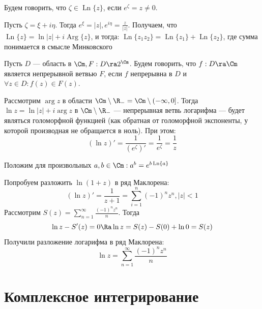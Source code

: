 \begin{note}

\end{note}

\begin{definition}
    Будем говорить, что \(\zeta \in \operatorname{Ln}\{z\}\), если \(e^\zeta = z \ne 0\).
\end{definition}
\begin{note}
    Пусть \(\zeta = \xi + i \eta\). Тогда \(e^\xi = |z|, e^{i\eta} = \frac{z}{|z|}\). Получаем, что \(\operatorname{Ln}\{z\} = \ln |z| + i \operatorname{Arg}\{z\}\), и тогда: \(\operatorname{Ln}\{z_1z_2\} = \operatorname{Ln}\{z_1\} + \operatorname{Ln}\{z_2\}\), где сумма понимается в смысле Минковского
\end{note}

\begin{definition}
    Пусть \(D\) --- область в \(\Cm, F: D \ra 2^{\Cm}\). Будем говорить, что \(f: D \ra \Cm\) является непрерывной ветвью \(F\), если \(f\) непрерывна в \(D\) и \(\forall z \in D: f(z) \in F(z)\).
\end{definition}

\begin{note}
    Рассмотрим \(\operatorname{arg} z\) в области \(\Cm \setminus \R_- = \Cm \setminus (-\infty, 0]\). Тогда \(\ln z = \ln |z| + i \operatorname{arg} z\) в \(\Cm \setminus \R_-\) --- непрерывная ветвь логарифма --- будет являться голоморфной функцией (как обратная от голоморфной экспоненты, у которой производная не обращается в ноль). При этом:
    \[(\ln z)' = \frac{1}{(e^\zeta)'} = \frac{1}{e^\zeta} = \frac{1}{z}\]
\end{note}

\begin{definition}
    Положим для произвольных \(a, b \in \Cm: a^b = e^{b \operatorname{Ln}\{a\}}\)
\end{definition}

Попробуем разложить \(\ln(1 + z)\) в ряд Маклорена: 
\[(\ln z)' = \frac{1}{z + 1} = \sum_{i = 1}^n (-1)^nz^n, |z| < 1\]
Рассмотрим \(S(z) = \sum_{n = 1}^\infty \frac{(-1)^nz^n}{n}\). Тогда
\[\ln z - S'(z) = 0 \Ra \ln z = S(z) - S(0) + \ln 0 = S(z) \]
Получили разложение логарифма в ряд Маклорена:
\[\ln z = \sum_{n = 1}^\infty \frac{(-1)^nz^n}{n}\]

\section{Комплексное интегрирование}

